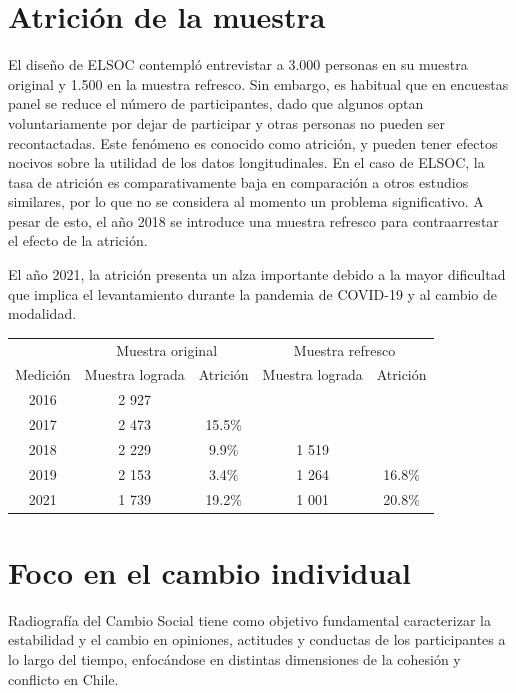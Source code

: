 \documentclass[
  12pt,
]{book}
\begin{document}
\hypertarget{atriciuxf3n-de-la-muestra}{%
\chapter{Atrición de la muestra}\label{atriciuxf3n-de-la-muestra}}

El diseño de ELSOC contempló entrevistar a 3.000 personas en su muestra original y 1.500 en la muestra refresco. Sin embargo, es habitual que en encuestas panel se reduce el número de participantes, dado que algunos optan voluntariamente por dejar de participar y otras personas no pueden ser recontactadas. Este fenómeno es conocido como atrición, y pueden tener efectos nocivos sobre la utilidad de los datos longitudinales. En el caso de ELSOC, la tasa de atrición es comparativamente baja en comparación a otros estudios similares, por lo que no se considera al momento un problema significativo. A pesar de esto, el año 2018 se introduce una muestra refresco para contraarrestar el efecto de la atrición.

El año 2021, la atrición presenta un alza importante debido a la mayor dificultad que implica el levantamiento durante la pandemia de COVID-19 y al cambio de modalidad.

\begin{table}
\centering
\begin{tabular}[t]{c|c|c|c|c}
\hline
\multicolumn{1}{c|}{ } & \multicolumn{2}{c|}{Muestra original} & \multicolumn{2}{c}{Muestra refresco} \\
\cline{2-3} \cline{4-5}
Medición & Muestra lograda & Atrición & Muestra lograda & Atrición\\
\hline
2016 & 2 927 &  &  & \\
\hline
2017 & 2 473 & 15.5\% &  & \\
\hline
2018 & 2 229 & 9.9\% & 1 519 & \\
\hline
2019 & 2 153 & 3.4\% & 1 264 & 16.8\%\\
\hline
2021 & 1 739 & 19.2\% & 1 001 & 20.8\%\\
\hline
\end{tabular}
\end{table}

\hypertarget{foco-en-el-cambio-individual}{%
\chapter{Foco en el cambio individual}\label{foco-en-el-cambio-individual}}

Radiografía del Cambio Social tiene como objetivo fundamental caracterizar la estabilidad y el cambio en opiniones, actitudes y conductas de los participantes a lo largo del tiempo, enfocándose en distintas dimensiones de la cohesión y conflicto en Chile.
\end{document}
